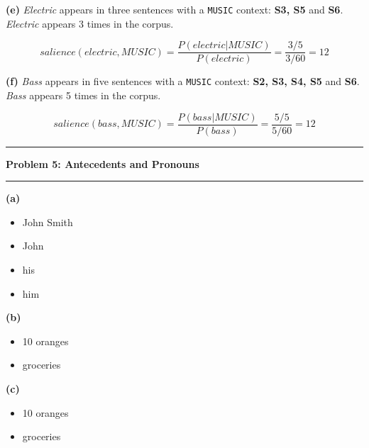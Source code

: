 \documentclass[11pt]{article}
\newcommand\question[2]{\vspace{.25in}\hrule\textbf{#1: #2}\vspace{.5em}\hrule\vspace{.10in}}
\renewcommand\part[1]{\vspace{.10in}\textbf{(#1)}}
\begin{document}

\part{e} \textit{Electric} appears in three sentences with a {\tt MUSIC} context: \textbf{S3, S5} and \textbf{S6}. \textit{Electric} appears 3 times in the corpus.

$$salience(electric, MUSIC) = \frac{P(electric | MUSIC)}{P(electric)} = \frac{3/5}{3/60} = 12$$


\part{f} \textit{Bass} appears in five sentences with a {\tt MUSIC} context: \textbf{S2, S3, S4, S5} and \textbf{S6}. \textit{Bass} appears 5 times in the corpus.

$$salience(bass, MUSIC) = \frac{P(bass | MUSIC)}{P(bass)} = \frac{5/5}{5/60} = 12$$


\question{Problem 5}{Antecedents and Pronouns}

\part{a}
\begin{itemize}
  \item John Smith
  \item John
  \item his
  \item him
\end{itemize}

\part{b}
\begin{itemize}
  \item 10 oranges
  \item groceries
\end{itemize}

\part{c}
\begin{itemize}
  \item 10 oranges
  \item groceries	
\end{itemize}
\end{document}
